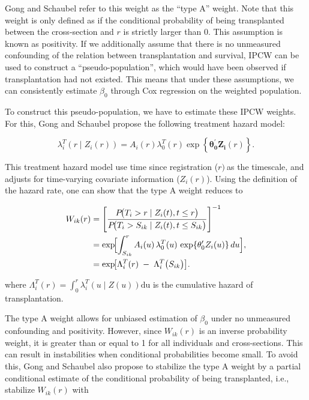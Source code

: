 \documentclass[11pt,twoside,]{book}
\begin{document}
Gong and Schaubel refer to this weight as the ``type A'' weight. Note that
this weight is only defined as if the conditional probability of being
transplanted between the cross-section and \(r\) is strictly larger than
0. This assumption is known as positivity. If we additionally assume that there is no unmeasured confounding of the
relation between transplantation and survival, IPCW can be used to
construct a ``pseudo-population'', which would have been observed if transplantation
had not existed. This means that under these assumptions, we can consistently
estimate \(\beta_0\) through Cox regression on the weighted population.

To construct this pseudo-population, we have to estimate these IPCW weights.
For this, Gong and Schaubel propose the following treatment hazard model:

\[\lambda_{i}^{T}\left( r \middle| Z_{i}\left( r \right) \right) = A_{i}\left( r \right)\lambda_{0}^{T}\left( r \right)\exp\left\{ \mathbf{\theta}_{\mathbf{0}}^{'}\mathbf{Z}_{\mathbf{i}}\left( r \right) \right\}.\]

This treatment hazard model use time since registration (\(r)\ \)as the
timescale, and adjusts for time-varying covariate information
(\(Z_{i}( r )\)). Using the definition of the hazard rate, one
can show that the type A weight reduces to

\[
\begin{aligned}
W_{ik}(r) 
  &= \left[ \frac{P\!\bigl(T_i > r \mid Z_i(t), t \le r\bigr)}
                 {P\!\bigl(T_i > S_{ik} \mid Z_i(t), t \le S_{ik}\bigr)} 
       \right]^{-1}\\
     &= \exp\!\Bigl[
            \int_{S_{ik}}^{r} A_i(u)\,\lambda_0^T(u)\,
                            \exp\{\theta_0' Z_i(u)\}\,du
       \Bigr],\\
  &= \exp\!\bigl[\Lambda_i^T(r) 
                \;-\;\Lambda_i^T\bigl(S_{ik}\bigr)\bigr].
\end{aligned}
\]

where
\(\Lambda_{i}^{T}\left( r \right) = \int_{0}^{r}{\lambda_{i}^{T}\left( u \middle| Z\left( u \right) \right)\text{du}}\)
is the cumulative hazard of transplantation.

The type A weight allows for unbiased estimation of \(\beta_{0}\) under no
unmeasured confounding and positivity. However, since
\(W_{ik}( r )\) is an inverse probability weight, it is
greater than or equal to 1 for all individuals and cross-sections. This
can result in instabilities when conditional probabilities become small.
To avoid this, Gong and Schaubel also propose to stabilize the type A
weight by a partial conditional estimate of the conditional probability
of being transplanted, i.e., stabilize \(W_{ik}( r )\)
with
\end{document}
